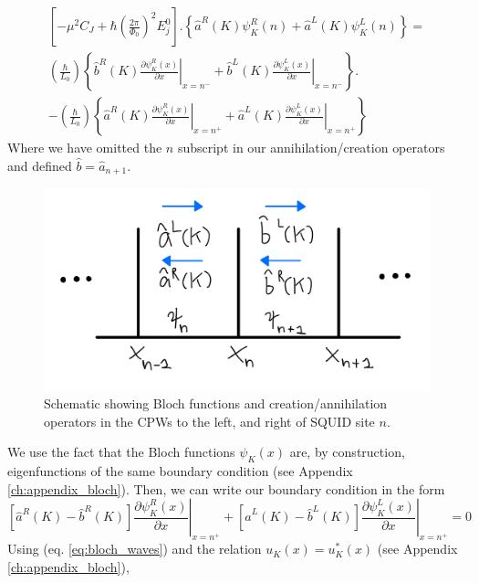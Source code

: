 \begin{equation}\label{eq:BC_static_1}
\begin{split}
    \left[-\mu^2 C_{J}+\hbar\left(\frac{2 \pi}{\Phi_{0}}\right)^{2} E_{j}^0\right].
    \left\lbrace\hat{a}^R(K) \psi^R_K(n) + \hat{a}^L(K) \psi^L_K(n) \right\rbrace =
    \\[2mm]
       \left(\frac{\hbar}{L_0}\right) 
    \left\lbrace\hat{b}^R(K) \left.\frac{\partial \psi^R_K(x)}{\partial x}\right|_{x=n^-} +\hat{b}^L(K) \left.\frac{\partial \psi^L_K(x)}{\partial x}\right|_{x=n^-}\right\rbrace.
    \\[2mm]
    -
    \left(\frac{\hbar}{L_0}\right) 
    \left\lbrace\hat{a}^R(K) \left.\frac{\partial \psi^R_K(x)}{\partial x}\right|_{x=n^+} +\hat{a}^L(K) \left.\frac{\partial \psi^L_K(x)}{\partial x}\right|_{x=n^+} \right\rbrace
\end{split}
\end{equation}
%
Where we have omitted the $n$ subscript in our annihilation/creation operators and defined $\hat{b} = \hat{a}_{n+1}$.
%
\begin{figure}\label{fig:boundary_schematic}
    \centering
    \includegraphics[width=4.5in, keepaspectratio]{figures/boundary_schematic.png}
    \caption{Schematic showing Bloch functions and creation/annihilation operators in the CPWs to the left, and right of SQUID site $n$.}
\end{figure}
%
We use the fact that the Bloch functions $\psi_K(x)$ are, by construction, eigenfunctions of the same boundary condition (see Appendix \ref{ch:appendix_bloch}). Then, we can write our boundary condition in the form
%
\begin{equation}
    \left[\hat{a}^R(K) - \hat{b}^R(K)\right]\left.\frac{\partial \psi^R_K(x)}{\partial x}\right|_{x=n^+}
    +
    \left[\hat{a}^L(K) - \hat{b}^L(K)\right]\left.\frac{\partial \psi^L_K(x)}{\partial x}\right|_{x=n^+} = 0 
\end{equation}
%
Using (eq. \ref{eq:bloch_waves}) and the relation $u_K(x) = u^*_K(x)$ (see Appendix \ref{ch:appendix_bloch}),
